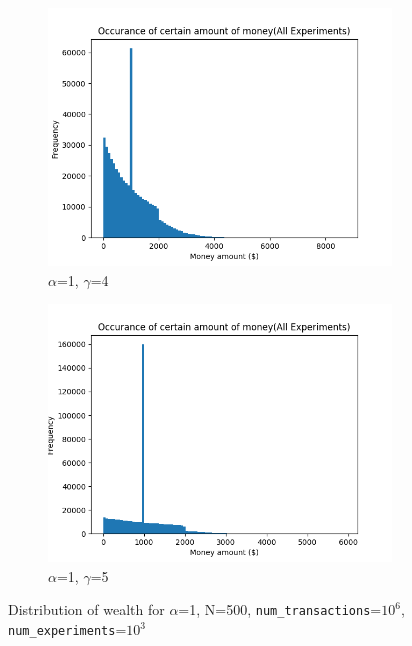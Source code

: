 \documentclass[12pt]{article} %
\begin{document}
\begin{figure}[h!]
	\begin{subfigure}{\scaleTextWidth\textwidth}
		\includegraphics[scale=\scaleResultsA]{a1g4.png}
		\caption{$\alpha$=1, $\gamma$=4}
		\label{fig:a1g4}
	\end{subfigure}
	\begin{subfigure}{\scaleTextWidth\textwidth}
		\includegraphics[scale=\scaleResultsA]{a1g5.png}
		\caption{$\alpha$=1, $\gamma$=5}
		\label{fig:a1g5}
	\end{subfigure}
	\caption{Distribution of wealth for $\alpha$=1, N=500,
	\texttt{num\_transactions}=$10^6$, \texttt{num\_experiments}=$10^3$}
\end{figure}
\end{document}
